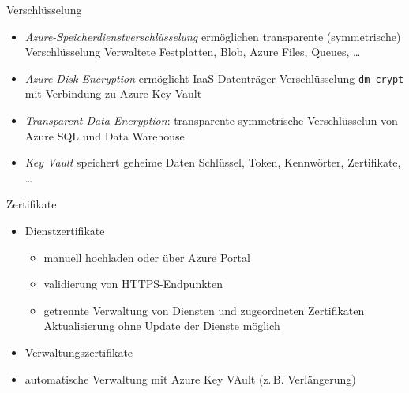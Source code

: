 
\begin{flashcard}[\ ]{Verschlüsselung}
    \begin{itemize}
        \item \emph{Azure-Speicherdienstverschlüsselung} ermöglichen transparente (symmetrische) Verschlüsselung\newline
            Verwaltete Festplatten, Blob, Azure Files, Queues, \ldots
        \item \emph{Azure Disk Encryption} ermöglicht IaaS-Datenträger-Verschlüsselung\newline
            \texttt{dm-crypt} mit Verbindung zu Azure Key Vault
        \item \emph{Transparent Data Encryption}: transparente symmetrische Verschlüsselun von Azure SQL und Data Warehouse
        \item \emph{Key Vault} speichert geheime Daten\newline
            Schlüssel, Token, Kennwörter, Zertifikate, \ldots
    \end{itemize}
\end{flashcard}

\begin{flashcard}[\ ]{Zertifikate}
    \begin{itemize}
        \item Dienstzertifikate
        \begin{itemize}
            \item manuell hochladen oder über Azure Portal
            \item validierung von HTTPS-Endpunkten
            \item getrennte Verwaltung von Diensten und zugeordneten Zertifikaten\newline
            Aktualisierung ohne Update der Dienste möglich
        \end{itemize}
        \item Verwaltungszertifikate
        \item automatische Verwaltung mit Azure Key VAult (z.\,B. Verlängerung)
    \end{itemize}

\end{flashcard}

